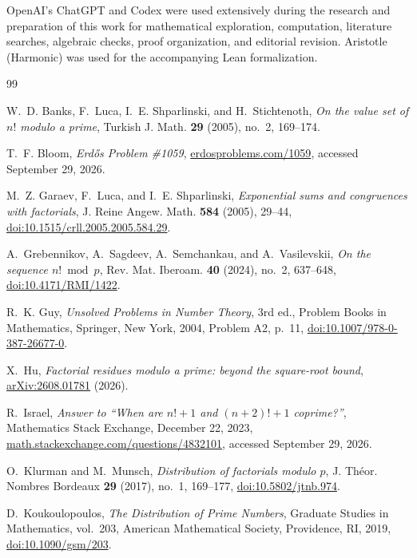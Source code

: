 \documentclass[11pt]{amsart}
\theoremstyle{definition}
\theoremstyle{remark}
\begin{document}
OpenAI's ChatGPT and Codex were used extensively during the research and
preparation of this work for mathematical exploration, computation,
literature searches, algebraic checks, proof organization, and editorial
revision.  Aristotle (Harmonic) was used for the accompanying Lean
formalization.
\begin{thebibliography}{99}

W.~D. Banks, F.~Luca, I.~E. Shparlinski, and H.~Stichtenoth,
\emph{On the value set of $n!$ modulo a prime},
Turkish J. Math. \textbf{29} (2005), no.~2, 169--174.

T.~F. Bloom,
\emph{Erd\H{o}s Problem \#1059},
\href{https://www.erdosproblems.com/1059}
{erdosproblems.com/1059}, accessed September 29, 2026.

M.~Z. Garaev, F.~Luca, and I.~E. Shparlinski,
\emph{Exponential sums and congruences with factorials},
J. Reine Angew. Math. \textbf{584} (2005), 29--44,
\href{https://doi.org/10.1515/crll.2005.2005.584.29}
{doi:10.1515/crll.2005.2005.584.29}.

A.~Grebennikov, A.~Sagdeev, A.~Semchankau, and A.~Vasilevskii,
\emph{On the sequence $n!\bmod p$},
Rev. Mat. Iberoam. \textbf{40} (2024), no.~2, 637--648,
\href{https://doi.org/10.4171/RMI/1422}{doi:10.4171/RMI/1422}.

R.~K. Guy,
\emph{Unsolved Problems in Number Theory},
3rd ed., Problem Books in Mathematics, Springer, New York, 2004,
Problem A2, p.~11,
\href{https://doi.org/10.1007/978-0-387-26677-0}
{doi:10.1007/978-0-387-26677-0}.

X.~Hu,
\emph{Factorial residues modulo a prime: beyond the square-root bound},
\href{https://arxiv.org/abs/2608.01781}{arXiv:2608.01781} (2026).

R.~Israel,
\emph{Answer to ``When are $n!+1$ and $(n+2)!+1$ coprime?''},
Mathematics Stack Exchange, December 22, 2023,
\href{https://math.stackexchange.com/questions/4832101/when-are-n1-and-n21-coprime}
{math.stackexchange.com/questions/4832101}, accessed September 29, 2026.

O.~Klurman and M.~Munsch,
\emph{Distribution of factorials modulo $p$},
J. Th\'eor. Nombres Bordeaux \textbf{29} (2017), no.~1, 169--177,
\href{https://doi.org/10.5802/jtnb.974}{doi:10.5802/jtnb.974}.

D.~Koukoulopoulos,
\emph{The Distribution of Prime Numbers},
Graduate Studies in Mathematics, vol.~203,
American Mathematical Society, Providence, RI, 2019,
\href{https://doi.org/10.1090/gsm/203}{doi:10.1090/gsm/203}.


\end{thebibliography}
\end{document}

